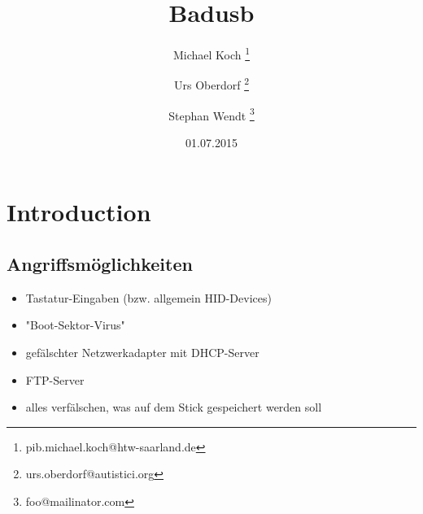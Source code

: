 \documentclass[
a4paper, %
twoside%
]{article}
\title{Badusb}
\author{Michael Koch
\thanks{pib.michael.koch@htw-saarland.de}
\and{Urs Oberdorf}
\thanks{urs.oberdorf@autistici.org}
\and{Stephan Wendt}
\thanks{foo@mailinator.com}}
\date{01.07.2015}
\begin{document}

\maketitle





\section{Introduction}
\subsection{Angriffsmöglichkeiten}
\begin{itemize}
\item Tastatur-Eingaben (bzw. allgemein HID-Devices)
\item "Boot-Sektor-Virus"
\item gefälschter Netzwerkadapter mit DHCP-Server
\item FTP-Server
\item alles verfälschen, was auf dem Stick gespeichert werden soll
\end{itemize}
\end{document}
